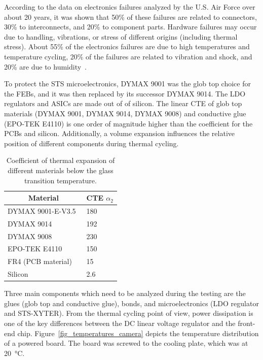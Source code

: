 According to the data on electronics failures analyzed by the U.S. Air Force over about 20 years, it was shown that 50\% of these failures are related to connectors, 30\% to interconnects, and 20\% to component
parts. Hardware failures may occur due to handling, vibrations, or stress of different origins (including thermal stress). About 55\% of the electronics failures are due to high temperatures and temperature cycling, 20\% of the failures are related to vibration and shock, and 20\% are due to humidity~\cite{thermal_electronics}. 

To protect the STS microelectronics, DYMAX 9001 was the glob top choice for the \glspl{FEB}, and it was then replaced by its successor DYMAX 9014. The \gls{LDO} regulators and \glspl{ASIC} are made out of of silicon. The linear CTE of glob top materials (DYMAX 9001, DYMAX 9014, DYMAX 9008) and conductive glue (EPO-TEK E4110) is one order of magnitude higher than the coefficient for the \glspl{PCB} and silicon. Additionally, a volume expansion influences the relative position of different components during thermal cycling.

\begin{table}[!h]
\begin{center}
\caption{Coefficient of thermal expansion of different materials below the glass transition temperature.}
\begin{tabular}{ll}
\hline
\multicolumn{1}{c}{Material} & \multicolumn{1}{c}{CTE $\alpha_{2}$} [\si{\micro\metre\per\metre\per\celsius]}] \\ \hline
DYMAX 9001-E-V3.5~\cite{9001}            & 180                                  \\
DYMAX 9014~\cite{9014}                   & 192                                  \\
DYMAX 9008~\cite{9008}                   & 230                                  \\
EPO-TEK E4110~\cite{4110}                & 150                                  \\ \hline
FR4 (\gls{PCB} material)~\cite{FR4}                          & 15                                   \\
Silicon~\cite{Si}                           & 2.6                                 
\end{tabular}
\label{TCE}
\end{center}
\end{table}
 \newpage
Three main components which need to be analyzed during the testing are the glues (glob top and conductive glue), bonds, and microelectronics (\gls{LDO} regulator and STS-XYTER). From the thermal cycling point of view, power dissipation is one of the key differences between the DC linear voltage regulator and the front-end chip. Figure~\ref{fig_temperatures_camera} depicts the temperature distribution of a powered board. The board was screwed to the cooling plate, which was at \SI{20}{\celsius}.

